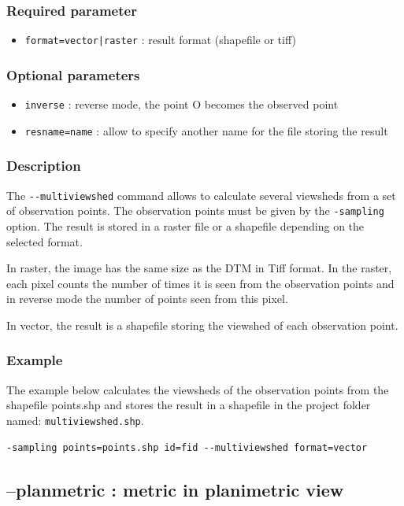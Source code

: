 \documentclass{report}
\begin{document}
\subsubsection{Required parameter}
\begin{itemize}
	\item \verb/format=vector|raster/ : result format (shapefile or tiff)
\end{itemize}

\subsubsection{Optional parameters}
\begin{itemize}
	\item \verb|inverse| : reverse mode, the point O becomes the observed point
	\item \verb|resname=name| : allow to specify another name for the file storing the result
\end{itemize}

\subsubsection{Description}
The \verb|--multiviewshed| command allows to calculate several viewsheds from a set of observation points. The observation points must be given by the \verb|-sampling| option. 
The result is stored in a raster file or a shapefile depending on the selected format.

In raster, the image has the same size as the DTM in Tiff format. In the raster, each pixel counts the number of times it is seen from the observation points and in reverse mode the number of points seen from this pixel.

In vector, the result is a shapefile storing the viewshed of each observation point.

\subsubsection{Example}
The example below calculates the viewsheds of the observation points from the shapefile points.shp and stores the result in a shapefile in the project folder named: \verb|multiviewshed.shp|.
\begin{Verbatim}
-sampling points=points.shp id=fid --multiviewshed format=vector
\end{Verbatim}


\subsection{--planmetric : metric in planimetric view}
\end{document}
